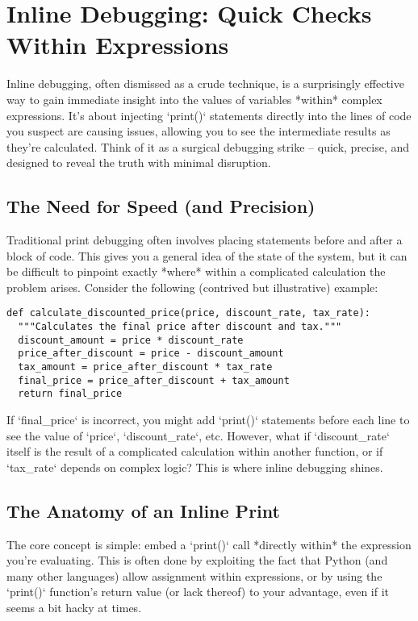 \documentclass{article}
\begin{document}
\chapter{Inline Debugging: Quick Checks Within Expressions}

Inline debugging, often dismissed as a crude technique, is a surprisingly effective way to gain immediate insight into the values of variables *within* complex expressions.  It's about injecting `print()` statements directly into the lines of code you suspect are causing issues, allowing you to see the intermediate results as they're calculated. Think of it as a surgical debugging strike – quick, precise, and designed to reveal the truth with minimal disruption.

\section*{The Need for Speed (and Precision)}

Traditional print debugging often involves placing statements before and after a block of code. This gives you a general idea of the state of the system, but it can be difficult to pinpoint exactly *where* within a complicated calculation the problem arises.  Consider the following (contrived but illustrative) example:

\begin{verbatim}
def calculate_discounted_price(price, discount_rate, tax_rate):
  """Calculates the final price after discount and tax."""
  discount_amount = price * discount_rate
  price_after_discount = price - discount_amount
  tax_amount = price_after_discount * tax_rate
  final_price = price_after_discount + tax_amount
  return final_price
\end{verbatim}

If `final_price` is incorrect, you might add `print()` statements before each line to see the value of `price`, `discount_rate`, etc.  However, what if `discount_rate` itself is the result of a complicated calculation within another function, or if `tax_rate` depends on complex logic?  This is where inline debugging shines.

\section*{The Anatomy of an Inline Print}

The core concept is simple: embed a `print()` call *directly within* the expression you're evaluating.  This is often done by exploiting the fact that Python (and many other languages) allow assignment within expressions, or by using the `print()` function's return value (or lack thereof) to your advantage, even if it seems a bit hacky at times.
\end{document}
